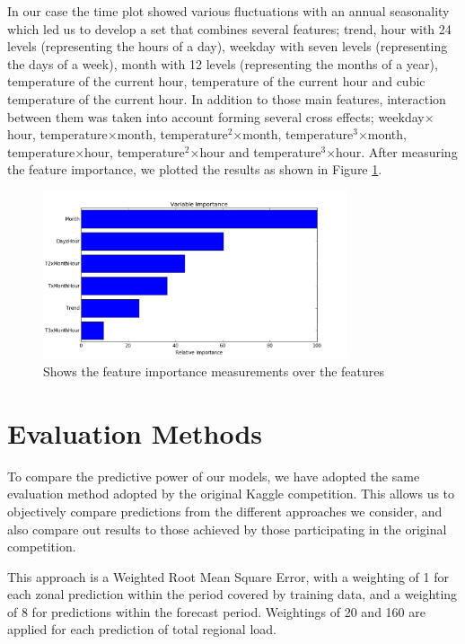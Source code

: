 \documentclass{article} %
\begin{document}
In our case the time plot showed various fluctuations with an annual seasonality which led us to develop a set that combines several features; trend, hour with 24 levels (representing the hours of a day), weekday with seven levels (representing the days of a week), month with 12 levels (representing the months of a year), temperature of the current hour, temperature of the current hour and cubic temperature of the current hour. In addition to those main features, interaction between them was taken into account forming several cross effects; weekday$\times$hour, temperature$\times$month, temperature$^2$$\times$month, temperature$^3$$\times$month, temperature$\times$hour, temperature$^2$$\times$hour and temperature$^3$$\times$hour. After measuring the feature importance, we plotted the results as shown in Figure \ref{fig:var_imp}.
\begin{figure}
  \centering
    \includegraphics[width=0.80\textwidth]{variable_importance}
  \caption{Shows the feature importance measurements over the features}
  \label{fig:var_imp}
\end{figure}

\section*{Evaluation Methods}
To compare the predictive power of our models, we have adopted the same evaluation method adopted by the original Kaggle competition.  This allows us to objectively compare predictions from the different approaches we consider, and also compare out results to those achieved by those participating in the original competition.

This approach is a Weighted Root Mean Square Error, with a weighting of 1 for each zonal prediction within the period covered by training data, and a weighting of 8 for predictions within the forecast period.  Weightings of 20 and 160 are applied for each prediction of total regional load.
\end{document}
